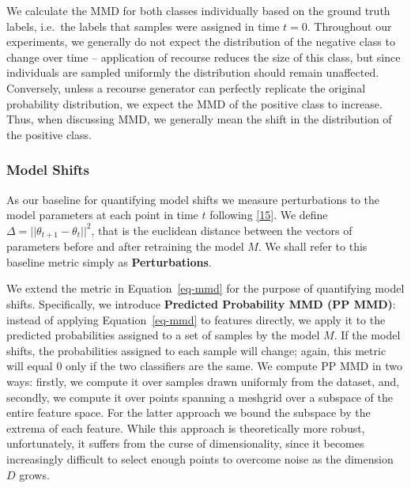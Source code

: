 \documentclass[
  conference]{IEEEtran}
\begin{document}
We calculate the MMD for both classes individually based on the ground
truth labels, i.e.~the labels that samples were assigned in time
\(t=0\). Throughout our experiments, we generally do not expect the
distribution of the negative class to change over time -- application of
recourse reduces the size of this class, but since individuals are
sampled uniformly the distribution should remain unaffected. Conversely,
unless a recourse generator can perfectly replicate the original
probability distribution, we expect the MMD of the positive class to
increase. Thus, when discussing MMD, we generally mean the shift in the
distribution of the positive class.

\hypertarget{model-shifts}{%
\subsubsection{Model Shifts}\label{model-shifts}}

As our baseline for quantifying model shifts we measure perturbations to
the model parameters at each point in time \(t\) following
\protect\hyperlink{ref-upadhyay2021towards}{{[}15{]}}. We define
\(\Delta=||\theta_{t+1}-\theta_{t}||^2\), that is the euclidean distance
between the vectors of parameters before and after retraining the model
\(M\). We shall refer to this baseline metric simply as
\textbf{Perturbations}.

We extend the metric in Equation~\ref{eq-mmd} for the purpose of
quantifying model shifts. Specifically, we introduce \textbf{Predicted
Probability MMD (PP MMD)}: instead of applying Equation~\ref{eq-mmd} to
features directly, we apply it to the predicted probabilities assigned
to a set of samples by the model \(M\). If the model shifts, the
probabilities assigned to each sample will change; again, this metric
will equal 0 only if the two classifiers are the same. We compute PP MMD
in two ways: firstly, we compute it over samples drawn uniformly from
the dataset, and, secondly, we compute it over points spanning a
meshgrid over a subspace of the entire feature space. For the latter
approach we bound the subspace by the extrema of each feature. While
this approach is theoretically more robust, unfortunately, it suffers
from the curse of dimensionality, since it becomes increasingly
difficult to select enough points to overcome noise as the dimension
\(D\) grows.
\end{document}
